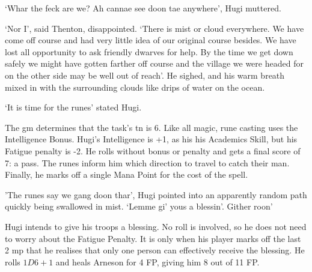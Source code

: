 \documentclass[titlepage,a4paper,openany]{book}
\begin{document}
\begin{multicols}{2}
{\begin{exampletext}
`Whar the feck are we? Ah cannae see doon tae anywhere', Hugi muttered.

`Nor I', said Thenton, disappointed. `There is mist or cloud everywhere. We have come off course and had very little idea of our original course besides. We have lost all opportunity to ask friendly dwarves for help. By the time we get down safely we might have gotten farther off course and the village we were headed for on the other side may be well out of reach'. He sighed, and his warm breath mixed in with the surrounding clouds like drips of water on the ocean.

`It is time for the runes' stated Hugi.

	The \gls{gm} determines that the task's \gls{tn} is 6. Like all magic, rune casting uses the Intelligence Bonus. Hugi's Intelligence is +1, as his his Academics Skill, but his Fatigue penalty is -2. He rolls without bonus or penalty and gets a final score of 7: a pass. The runes inform him which direction to travel to catch their man. Finally, he marks off a single Mana Point for the cost of the spell.

'The runes say we gang doon thar', Hugi pointed into an apparently random path quickly being swallowed in mist. `Lemme gi' yous a blessin'. Gither roon'

Hugi intends to give his troops a blessing. No roll is involved, so he does not need to worry about the Fatigue Penalty. It is only when his player marks off the last 2 \gls{mp} that he realises that only one person can effectively receive the blessing. He rolls $1D6+1$ and heals Arneson for 4 FP, giving him 8 out of 11 FP.

\end{exampletext}
	}{}

\end{multicols}

\end{document}
